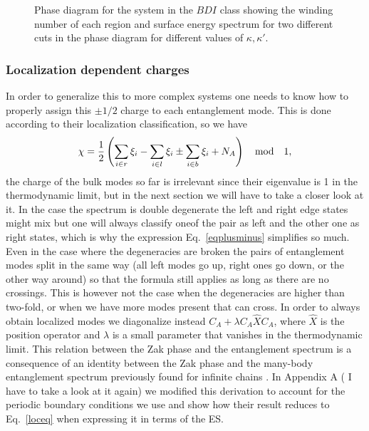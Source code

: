 \documentclass[twocolumn,amsmath,longbibliography,amssymb,superscriptaddress]{revtex4-1}
\newcommand{\carlos}[1]{{\color{red} #1}}
\begin{document}
\begin{figure}[h!]
\centering
{}
\caption{Phase diagram for the system in the $BDI$ class showing the winding number of each region and surface energy spectrum for two different cuts in the phase diagram for different values of $\kappa,\kappa'$.}
\label{huang}
\end{figure}

\subsubsection{Localization dependent charges}

In order to generalize this to more complex systems one needs to know how to properly assign this $\pm 1/2$ charge to each entanglement mode. This is done according to their localization classification, so we have
\begin{equation}
\chi = \frac{1}{2} \left( \sum_{i\in r}\xi_i-\sum_{i\in l}\xi_i \pm \sum_{i\in b}\xi_i  + N_A \right) \quad {\rm mod} \quad 1,
\label{loceq}
\end{equation}
the charge of the bulk modes so far is irrelevant since their eigenvalue is 1 in the thermodynamic limit, but in the next section we will have to take a closer look at it.  In the case the spectrum is double degenerate the left and right edge states might mix but one will always classify oneof the pair as left and the other one as right states, which is why the expression Eq.~\eqref{eqplusminus} simplifies so much. Even in the case where the degeneracies are broken the pairs of entanglement modes split in the same way (all left modes go up, right ones go down, or the other way around) so that the formula still applies as long as there are no crossings. This is however not the case when the degeneracies are higher than two-fold, or when we have more modes present that can cross. In order to always obtain localized modes we diagonalize instead $C_A + \lambda C_A\hat{X}C_A$, where $\hat{X}$ is the position operator and $\lambda$ is a small parameter that vanishes in the thermodynamic limit. This relation between the Zak phase and the entanglement spectrum is a consequence of an identity between the Zak phase and the many-body entanglement spectrum previously found for infinite chains \cite{Zaletel2014}. In Appendix A (\carlos{I have to take a look at it again}) we modified this derivation to account for the periodic boundary conditions we use and show how their result reduces to Eq.~\eqref{loceq} when expressing it in terms of the ES.
\end{document}
